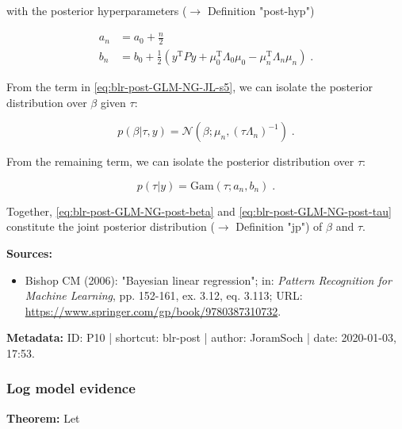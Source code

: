 \documentclass[a4paper,12pt]{book}
\begin{document}
with the posterior hyperparameters ($\rightarrow$ Definition "post-hyp")

\begin{equation} \label{eq:blr-post-GLM-NG-post-tau-par}
\begin{split}
a_n &= a_0 + \frac{n}{2} \\
b_n &= b_0 + \frac{1}{2} (y^\mathrm{T} P y + \mu_0^\mathrm{T} \Lambda_0 \mu_0 - \mu_n^\mathrm{T} \Lambda_n \mu_n) \; .
\end{split}
\end{equation}

From the term in \eqref{eq:blr-post-GLM-NG-JL-s5}, we can isolate the posterior distribution over $\beta$ given $\tau$:

\begin{equation} \label{eq:blr-post-GLM-NG-post-beta}
p(\beta|\tau,y) = \mathcal{N}(\beta; \mu_n, (\tau \Lambda_n)^{-1}) \; .
\end{equation}

From the remaining term, we can isolate the posterior distribution over $\tau$:

\begin{equation} \label{eq:blr-post-GLM-NG-post-tau}
p(\tau|y) = \mathrm{Gam}(\tau; a_n, b_n) \; .
\end{equation}

Together, \eqref{eq:blr-post-GLM-NG-post-beta} and \eqref{eq:blr-post-GLM-NG-post-tau} constitute the joint posterior distribution ($\rightarrow$ Definition "jp") of $\beta$ and $\tau$.

\vspace{1em}
\textbf{Sources:}
\begin{itemize}
\item Bishop CM (2006): "Bayesian linear regression"; in: \textit{Pattern Recognition for Machine Learning}, pp. 152-161, ex. 3.12, eq. 3.113; URL: \url{https://www.springer.com/gp/book/9780387310732}.
\end{itemize}


\vspace{1em}
\textbf{Metadata:} ID: P10 | shortcut: blr-post | author: JoramSoch | date: 2020-01-03, 17:53.


\subsubsection[\textbf{Log model evidence}]{Log model evidence} \label{sec:blr-lme}

\vspace{1em}
\textbf{Theorem:} Let
\end{document}
